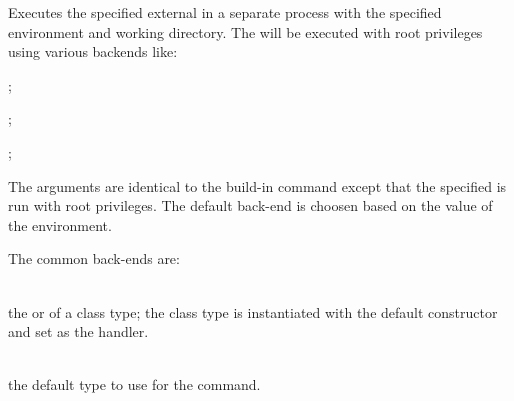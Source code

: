%


Executes the specified external  in a separate process with the
specified environment and working directory. The  will be executed
with root privileges using various backends like:
\begin{compactitem}
\item {}\cite{sudo(8)13};
\item {}\cite{kdesu13};
\item {}\cite{gksu13};
\end{compactitem}

The arguments are identical to the  build-in command except
that the specified  is run with root privileges. The default
back-end is choosen based on the value of the 
environment.

The common back-ends are:
\begin{compactitem}
\item {}
\item {}
\item {}
\end{compactitem}

\begin{asparaitem}
%
\item[\code{backend: backend}] \hfill \\
the  or of a class 
type; the class type is instantiated with the default
constructor and set as the handler.
%
\item[\Variable{SUDO\_BACKEND}] \hfill \\
the default  type to use for the  command.
%
\end{asparaitem}


